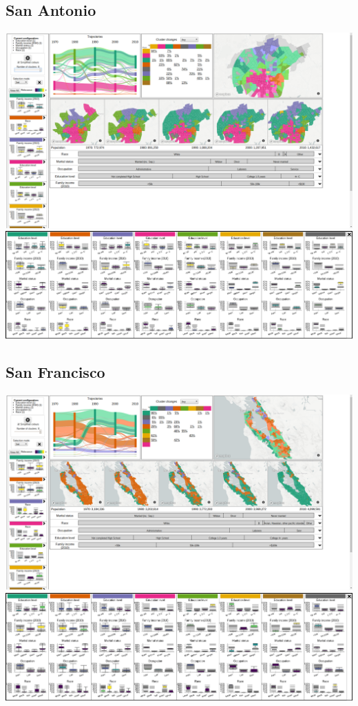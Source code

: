 \documentclass[a4paper]{article}
\begin{document}
\subsection{San Antonio}
\begin{center}
	\includegraphics[width=\linewidth]{35a.png}
	\includegraphics[width=\linewidth]{35b.png}
\end{center} \clearpage



\subsection{San Francisco}
\begin{center}
	\includegraphics[width=\linewidth]{36a.png}
	\includegraphics[width=\linewidth]{36b.png}
\end{center} \clearpage
\end{document}

